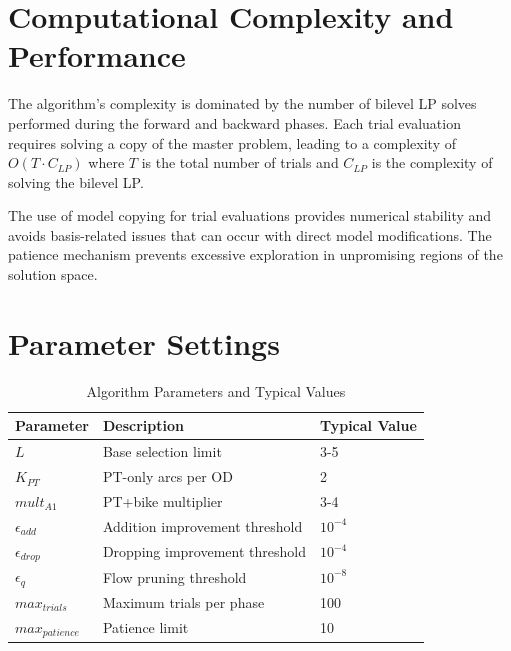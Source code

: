 \documentclass[11pt,a4paper]{article}
\begin{document}
\section{Computational Complexity and Performance}

The algorithm's complexity is dominated by the number of bilevel LP solves performed during the forward and backward phases. Each trial evaluation requires solving a copy of the master problem, leading to a complexity of $O(T \cdot C_{LP})$ where $T$ is the total number of trials and $C_{LP}$ is the complexity of solving the bilevel LP.

The use of model copying for trial evaluations provides numerical stability and avoids basis-related issues that can occur with direct model modifications. The patience mechanism prevents excessive exploration in unpromising regions of the solution space.

\section{Parameter Settings}

\begin{table}[htbp]
\centering
\caption{Algorithm Parameters and Typical Values}
\label{tab:parameters}
\begin{tabular}{@{}lll@{}}
\toprule
Parameter & Description & Typical Value \\
\midrule
$L$ & Base selection limit & 3-5 \\
$K_{PT}$ & PT-only arcs per OD & 2 \\
$mult_{A1}$ & PT+bike multiplier & 3-4 \\
$\epsilon_{add}$ & Addition improvement threshold & $10^{-4}$ \\
$\epsilon_{drop}$ & Dropping improvement threshold & $10^{-4}$ \\
$\epsilon_q$ & Flow pruning threshold & $10^{-8}$ \\
$max_{trials}$ & Maximum trials per phase & 100 \\
$max_{patience}$ & Patience limit & 10 \\
\bottomrule
\end{tabular}
\end{table}
\end{document}
